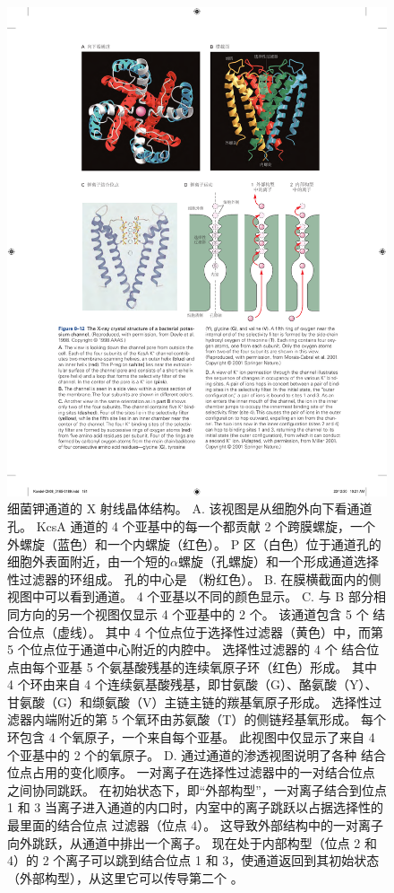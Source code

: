 \begin{figure}[htbp]
	\centering
	\includegraphics[width=0.9\linewidth]{chap08/fig_8_12}
	\caption{细菌钾通道的 X 射线晶体结构\cite{doyle1998structure}。
		A. 该视图是从细胞外向下看通道孔。
		KcsA  通道的 4 个亚基中的每一个都贡献 2 个跨膜螺旋，一个外螺旋（蓝色）和一个内螺旋（红色）。
		P 区（白色）位于通道孔的细胞外表面附近，由一个短的$\alpha$螺旋（孔螺旋）和一个形成通道选择性过滤器的环组成。
		孔的中心是  （粉红色）。
		B. 在膜横截面内的侧视图中可以看到通道。 4 个亚基以不同的颜色显示。
		C. 与 B 部分相同方向的另一个视图仅显示 4 个亚基中的 2 个。
		该通道包含 5 个  结合位点（虚线）。
		其中 4 个位点位于选择性过滤器（黄色）中，而第 5 个位点位于通道中心附近的内腔中。
		选择性过滤器的 4 个  结合位点由每个亚基 5 个氨基酸残基的连续氧原子环（红色）形成。
		其中 4 个环由来自 4 个连续氨基酸残基，即甘氨酸（G）、酪氨酸（Y）、甘氨酸（G）和缬氨酸（V）主链主链的羰基氧原子形成。
		选择性过滤器内端附近的第 5 个氧环由苏氨酸（T）的侧链羟基氧形成。
		每个环包含 4 个氧原子，一个来自每个亚基。
		此视图中仅显示了来自 4 个亚基中的 2 个的氧原子\cite{morais2001energetic}。
		D.  通过通道的渗透视图说明了各种  结合位点占用的变化顺序。
		一对离子在选择性过滤器中的一对结合位点之间协同跳跃。
		在初始状态下，即“外部构型”，一对离子结合到位点 1 和 3
		当离子进入通道的内口时，内室中的离子跳跃以占据选择性的最里面的结合位点 过滤器（位点 4）。
		这导致外部结构中的一对离子向外跳跃，从通道中排出一个离子。
		现在处于内部构型（位点 2 和 4）的 2 个离子可以跳到结合位点 1 和 3，使通道返回到其初始状态（外部构型），从这里它可以传导第二个  \cite{miller2001see}。}
	\label{fig:8_12}
\end{figure}



